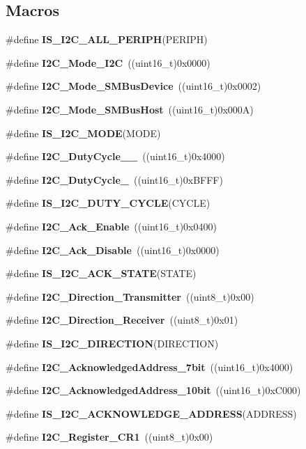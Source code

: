 \subsection*{Macros}
\begin{DoxyCompactItemize}
\item 
\#define \textbf{ I\+S\+\_\+\+I2\+C\+\_\+\+A\+L\+L\+\_\+\+P\+E\+R\+I\+PH}(P\+E\+R\+I\+PH)
\item 
\#define \textbf{ I2\+C\+\_\+\+Mode\+\_\+\+I2C}~((uint16\+\_\+t)0x0000)
\item 
\#define \textbf{ I2\+C\+\_\+\+Mode\+\_\+\+S\+M\+Bus\+Device}~((uint16\+\_\+t)0x0002)
\item 
\#define \textbf{ I2\+C\+\_\+\+Mode\+\_\+\+S\+M\+Bus\+Host}~((uint16\+\_\+t)0x000\+A)
\item 
\#define \textbf{ I\+S\+\_\+\+I2\+C\+\_\+\+M\+O\+DE}(M\+O\+DE)
\item 
\#define \textbf{ I2\+C\+\_\+\+Duty\+Cycle\+\_\+\_}~((uint16\+\_\+t)0x4000)
\item 
\#define \textbf{ I2\+C\+\_\+\+Duty\+Cycle\+\_}~((uint16\+\_\+t)0x\+B\+F\+F\+F)
\item 
\#define \textbf{ I\+S\+\_\+\+I2\+C\+\_\+\+D\+U\+T\+Y\+\_\+\+C\+Y\+C\+LE}(C\+Y\+C\+LE)
\item 
\#define \textbf{ I2\+C\+\_\+\+Ack\+\_\+\+Enable}~((uint16\+\_\+t)0x0400)
\item 
\#define \textbf{ I2\+C\+\_\+\+Ack\+\_\+\+Disable}~((uint16\+\_\+t)0x0000)
\item 
\#define \textbf{ I\+S\+\_\+\+I2\+C\+\_\+\+A\+C\+K\+\_\+\+S\+T\+A\+TE}(S\+T\+A\+TE)
\item 
\#define \textbf{ I2\+C\+\_\+\+Direction\+\_\+\+Transmitter}~((uint8\+\_\+t)0x00)
\item 
\#define \textbf{ I2\+C\+\_\+\+Direction\+\_\+\+Receiver}~((uint8\+\_\+t)0x01)
\item 
\#define \textbf{ I\+S\+\_\+\+I2\+C\+\_\+\+D\+I\+R\+E\+C\+T\+I\+ON}(D\+I\+R\+E\+C\+T\+I\+ON)
\item 
\#define \textbf{ I2\+C\+\_\+\+Acknowledged\+Address\+\_\+7bit}~((uint16\+\_\+t)0x4000)
\item 
\#define \textbf{ I2\+C\+\_\+\+Acknowledged\+Address\+\_\+10bit}~((uint16\+\_\+t)0x\+C000)
\item 
\#define \textbf{ I\+S\+\_\+\+I2\+C\+\_\+\+A\+C\+K\+N\+O\+W\+L\+E\+D\+G\+E\+\_\+\+A\+D\+D\+R\+E\+SS}(A\+D\+D\+R\+E\+SS)
\item 
\#define \textbf{ I2\+C\+\_\+\+Register\+\_\+\+C\+R1}~((uint8\+\_\+t)0x00)

\end{DoxyCompactItemize}
